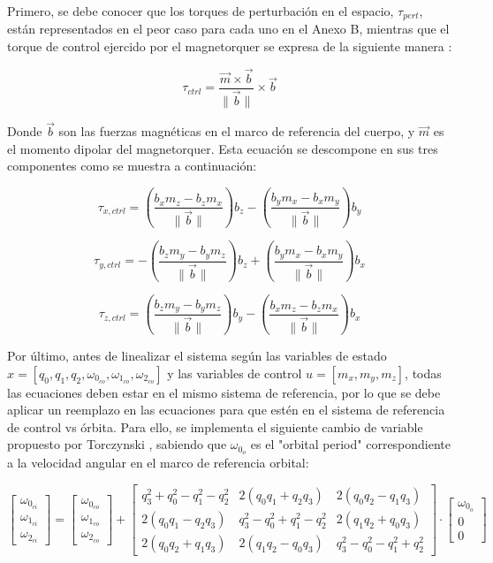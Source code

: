 Primero, se debe conocer que los torques de perturbación en el espacio, $\tau_{pert}$, están representados en el peor caso para cada uno en el Anexo B, mientras que el torque de control ejercido por el magnetorquer se expresa de la siguiente manera \cite{ref14}:

\begin{equation}
	\tau_{ctrl} = \frac{\vec{m} \times \vec{b}}{\|\vec{b}\|} \times \vec{b}
\end{equation}

Donde $\vec{b}$ son las fuerzas magnéticas en el marco de referencia del cuerpo, y $\vec{m}$ es el momento dipolar del magnetorquer. Esta ecuación se descompone en sus tres componentes como se muestra a continuación:

\[
	\tau_{x,ctrl} = \left( \frac{b_x m_z - b_z m_x}{\|\vec{b}\|} \right) b_z - \left( \frac{b_y m_x - b_x m_y}{\|\vec{b}\|} \right) b_y
\]

\[
	\tau_{y,ctrl} = -\left( \frac{b_z m_y - b_y m_z}{\|\vec{b}\|} \right) b_z + \left( \frac{b_y m_x - b_x m_y}{\|\vec{b}\|} \right) b_x
\]

\[
	\tau_{z,ctrl} = \left( \frac{b_z m_y - b_y m_z}{\|\vec{b}\|} \right) b_y - \left( \frac{b_x m_z - b_z m_x}{\|\vec{b}\|} \right) b_x
\]

Por último, antes de linealizar el sistema según las variables de estado $x = [q_0, q_1, q_2, \omega_{0_{co}}, \omega_{1_{co}}, \omega_{2_{co}}]$ y las variables de control $u = [m_x, m_y, m_z]$, todas las ecuaciones deben estar en el mismo sistema de referencia, por lo que se debe aplicar un reemplazo en las ecuaciones para que estén en el sistema de referencia de control vs órbita. Para ello, se implementa el siguiente cambio de variable propuesto por Torczynski \cite{ref14}, sabiendo que $\omega_{0_o}$ es el "orbital period" correspondiente a la velocidad angular en el marco de referencia orbital:

\[
\begin{bmatrix}
	\omega_{0_{ci}} \\
	\omega_{1_{ci}} \\
	\omega_{2_{ci}}
\end{bmatrix}
=
\begin{bmatrix}
	\omega_{0_{co}} \\
	\omega_{1_{co}} \\
	\omega_{2_{co}}
\end{bmatrix}
+
\begin{bmatrix}
	q_3^2 + q_0^2 - q_1^2 - q_2^2 & 2(q_0 q_1 + q_2 q_3) & 2(q_0 q_2 - q_1 q_3) \\
	2(q_0 q_1 - q_2 q_3) & q_3^2 - q_0^2 + q_1^2 - q_2^2 & 2(q_1 q_2 + q_0 q_3) \\
	2(q_0 q_2 + q_1 q_3) & 2(q_1 q_2 - q_0 q_3) & q_3^2 - q_0^2 - q_1^2 + q_2^2
\end{bmatrix}
\cdot
\begin{bmatrix}
	\omega_{0_o} \\
	0 \\
	0
\end{bmatrix}
\]

